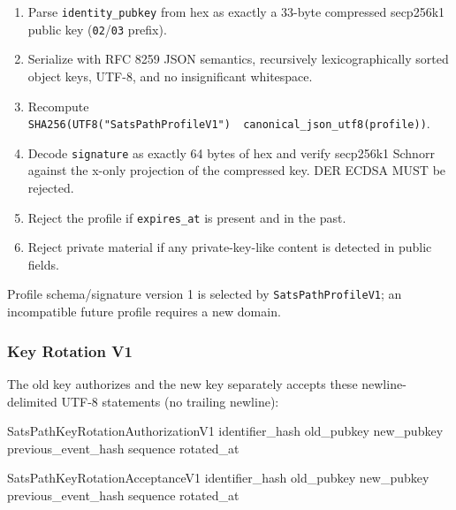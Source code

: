 \documentclass[
]{article}
\newenvironment{Shaded}{}{}
\newcommand{\NormalTok}[1]{#1}
\providecommand{\tightlist}{%
  \setlength{\itemsep}{0pt}\setlength{\parskip}{0pt}}
\begin{document}
\begin{enumerate}
\def\labelenumi{\arabic{enumi}.}
\tightlist
\item
  Parse \texttt{identity\_pubkey} from hex as exactly a 33-byte
  compressed secp256k1 public key (\texttt{02}/\texttt{03} prefix).
\item
  Serialize with RFC 8259 JSON semantics, recursively lexicographically
  sorted object keys, UTF-8, and no insignificant whitespace.
\item
  Recompute
  \texttt{SHA256(UTF8("SatsPathProfileV1")\ \textbar{}\textbar{}\ canonical\_json\_utf8(profile))}.
\item
  Decode \texttt{signature} as exactly 64 bytes of hex and verify
  secp256k1 Schnorr against the x-only projection of the compressed key.
  DER ECDSA MUST be rejected.
\item
  Reject the profile if \texttt{expires\_at} is present and in the past.
\item
  Reject private material if any private-key-like content is detected in
  public fields.
\end{enumerate}

Profile schema/signature version 1 is selected by
\texttt{SatsPathProfileV1}; an incompatible future profile requires a
new domain.

\hypertarget{key-rotation-v1}{%
\subsubsection{Key Rotation V1}\label{key-rotation-v1}}

The old key authorizes and the new key separately accepts these
newline-delimited UTF-8 statements (no trailing newline):

\begin{Shaded}
\begin{Highlighting}[]
\NormalTok{SatsPathKeyRotationAuthorizationV1}
\NormalTok{identifier\_hash}
\NormalTok{old\_pubkey}
\NormalTok{new\_pubkey}
\NormalTok{previous\_event\_hash}
\NormalTok{sequence}
\NormalTok{rotated\_at}
\end{Highlighting}
\end{Shaded}

\begin{Shaded}
\begin{Highlighting}[]
\NormalTok{SatsPathKeyRotationAcceptanceV1}
\NormalTok{identifier\_hash}
\NormalTok{old\_pubkey}
\NormalTok{new\_pubkey}
\NormalTok{previous\_event\_hash}
\NormalTok{sequence}
\NormalTok{rotated\_at}
\end{Highlighting}
\end{Shaded}
\end{document}
